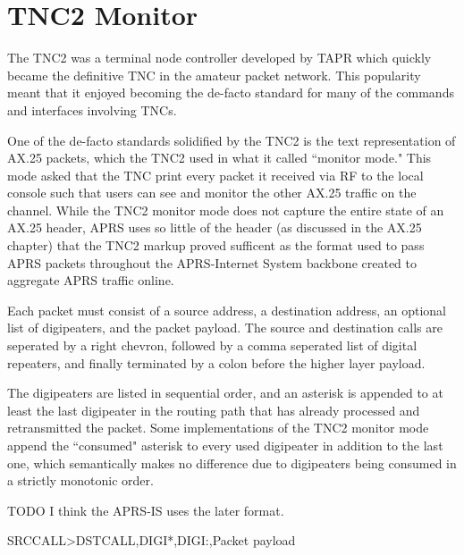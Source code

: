 \chapter{TNC2 Monitor}

The TNC2 was a terminal node controller developed by TAPR which
quickly became the definitive TNC in the amateur packet network.
This popularity meant that it enjoyed becoming the de-facto 
standard for many of the commands and interfaces involving 
TNCs.

One of the de-facto standards solidified by the TNC2 is the text
representation of AX.25 packets, which the TNC2 used in what it
called ``monitor mode." This mode asked that the TNC print 
every packet it received via RF to the local console such that
users can see and monitor the other AX.25 traffic on the channel.
While the TNC2 monitor mode does not capture the entire state of 
an AX.25 header, APRS uses so little of the header (as discussed in
the AX.25 chapter) that the TNC2 markup proved sufficent as the 
format used to pass APRS packets throughout the APRS-Internet System
backbone created to aggregate APRS traffic online.

Each packet must consist of a source address, a destination address,
an optional list of digipeaters, and the packet payload.
The source and destination calls are seperated by a right chevron,
followed by a comma seperated list of digital repeaters, and finally
terminated by a colon before the higher layer payload.

The digipeaters are listed in sequential order, and an asterisk
is appended to at least the last digipeater in the 
routing path that has already processed and retransmitted the packet.
Some implementations of the TNC2 monitor mode append the ``consumed"
asterisk to every used digipeater in addition to the last one,
which semantically makes no difference due to digipeaters
being consumed in a strictly monotonic order.

TODO I think the APRS-IS uses the later format.

SRCCALL\textgreater{}DSTCALL,DIGI*,DIGI:,Packet payload
